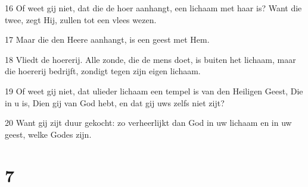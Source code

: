 \par 16 Of weet gij niet, dat die de hoer aanhangt, een lichaam met haar is? Want die twee, zegt Hij, zullen tot een vlees wezen.
\par 17 Maar die den Heere aanhangt, is een geest met Hem.
\par 18 Vliedt de hoererij. Alle zonde, die de mens doet, is buiten het lichaam, maar die hoererij bedrijft, zondigt tegen zijn eigen lichaam.
\par 19 Of weet gij niet, dat ulieder lichaam een tempel is van den Heiligen Geest, Die in u is, Dien gij van God hebt, en dat gij uws zelfs niet zijt?
\par 20 Want gij zijt duur gekocht: zo verheerlijkt dan God in uw lichaam en in uw geest, welke Godes zijn.

\chapter{7}

